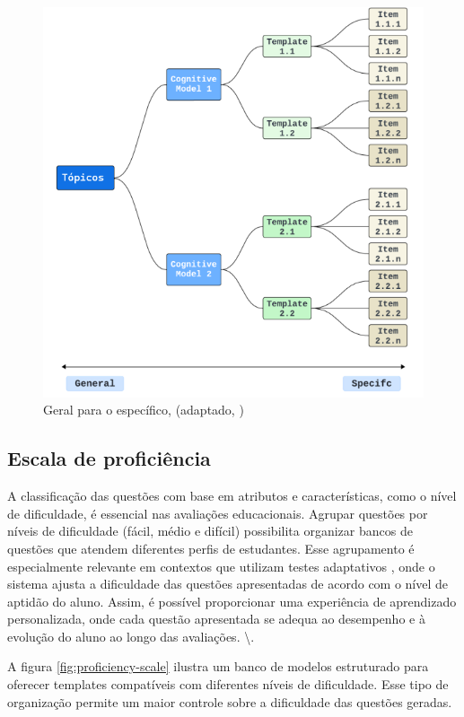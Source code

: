 \begin{figure}[ht]
	\centering
	\includegraphics[width=14cm]{./imagens/capitulo5/geral-especifico-com-topicos}
	\caption{Geral para o específico, (adaptado, \cite{hendrickson2010}) }
	\label{fig:geral-to-specif}
\end{figure}


\subsection{Escala de proficiência}

A classificação das questões com base em atributos e características, como o nível de dificuldade, é essencial nas avaliações educacionais. Agrupar questões por níveis de dificuldade (fácil, médio e difícil) possibilita organizar bancos de questões que atendem diferentes perfis de estudantes.  Esse agrupamento é especialmente relevante em contextos que utilizam testes adaptativos , onde o sistema ajusta a dificuldade das questões apresentadas de acordo com o nível de aptidão do aluno. Assim, é possível proporcionar uma experiência de aprendizado personalizada, onde cada questão apresentada se adequa ao desempenho e à evolução do aluno ao longo das avaliações. \textbackslash{}\parencite{pasquali2018}. 


A figura \ref{fig:proficiency-scale}  ilustra um banco de modelos estruturado para oferecer templates compatíveis com diferentes níveis de dificuldade. Esse tipo de organização permite um maior controle sobre a dificuldade das questões geradas.


